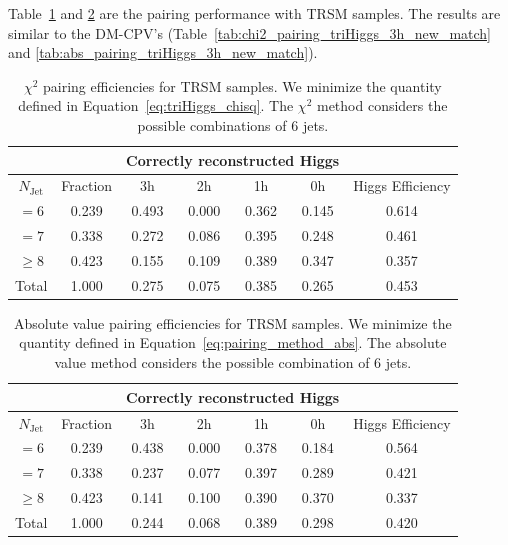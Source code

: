 \documentclass[12pt]{article}
\begin{document}
    Table~\ref{tab:chi2_pairing_triHiggs_3h_trsm} and \ref{tab:abs_pairing_triHiggs_3h_trsm} are the pairing performance with TRSM samples. The results are similar to the DM-CPV's (Table~\ref{tab:chi2_pairing_triHiggs_3h_new_match} and \ref{tab:abs_pairing_triHiggs_3h_new_match}).
    \begin{table}[htpb]
        \centering
        \caption{$\chi^2$ pairing efficiencies for TRSM samples. We minimize the quantity defined in Equation~\ref{eq:triHiggs_chisq}. The $\chi^2$ method considers the possible combinations of 6 jets.}
        \label{tab:chi2_pairing_triHiggs_3h_trsm}
        \begin{tabular}{c|c|cccc|c}
        \multicolumn{1}{l|}{} &          & \multicolumn{4}{c|}{Correctly reconstructed Higgs} & \multicolumn{1}{l}{} \\ \hline
        $N_\text{Jet}$        & Fraction & 3h          & 2h         & 1h         & 0h         & Higgs Efficiency     \\ \hline
        $=6$                  & 0.239 & 0.493 & 0.000 & 0.362 & 0.145 & 0.614 \\
        $=7$                  & 0.338 & 0.272 & 0.086 & 0.395 & 0.248 & 0.461 \\
        $\ge 8$               & 0.423 & 0.155 & 0.109 & 0.389 & 0.347 & 0.357 \\ \hline
        Total                 & 1.000 & 0.275 & 0.075 & 0.385 & 0.265 & 0.453
        \end{tabular}
    \end{table}
    \begin{table}[htpb]
        \centering
        \caption{Absolute value pairing efficiencies for TRSM samples. We minimize the quantity defined in Equation~\ref{eq:pairing_method_abs}. The absolute value method considers the possible combination of 6 jets.}
        \label{tab:abs_pairing_triHiggs_3h_trsm}
        \begin{tabular}{c|c|cccc|c}
        \multicolumn{1}{l|}{} &          & \multicolumn{4}{c|}{Correctly reconstructed Higgs} & \multicolumn{1}{l}{} \\ \hline
        $N_\text{Jet}$        & Fraction & 3h          & 2h         & 1h         & 0h         & Higgs Efficiency     \\ \hline
        $=6$                  & 0.239 & 0.438 & 0.000 & 0.378 & 0.184 & 0.564 \\
        $=7$                  & 0.338 & 0.237 & 0.077 & 0.397 & 0.289 & 0.421 \\
        $\ge 8$               & 0.423 & 0.141 & 0.100 & 0.390 & 0.370 & 0.337 \\ \hline
        Total                 & 1.000 & 0.244 & 0.068 & 0.389 & 0.298 & 0.420
        \end{tabular}
    \end{table}
\end{document}
